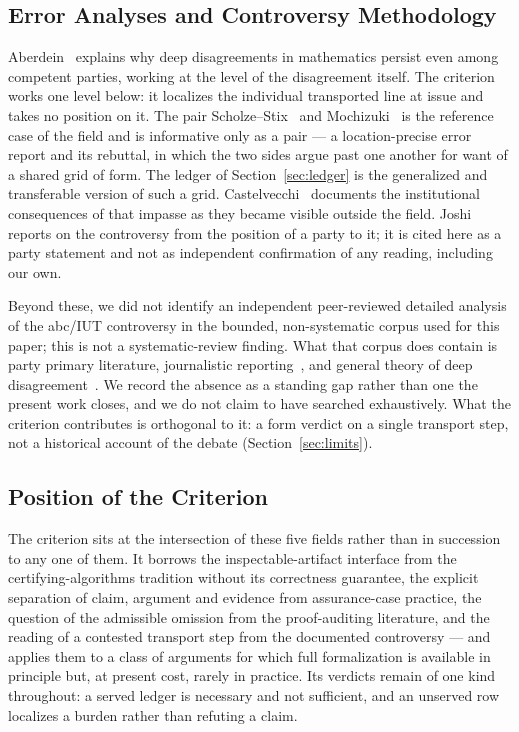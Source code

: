 \documentclass[11pt,a4paper]{article}
\begin{document}
\subsection{Error Analyses and Controversy Methodology}\label{sec:related-controversy}

Aberdein~\cite{Aberdein2023} explains why deep disagreements in mathematics
persist even among competent parties, working at the level of the disagreement
itself. The criterion works one level below: it localizes the individual
transported line at issue and takes no position on it. The pair
Scholze--Stix~\cite{ScholzeStix2018} and Mochizuki~\cite{Mochizuki2019} is the
reference case of the field and is informative only as a pair --- a
location-precise error report and its rebuttal, in which the two sides argue past
one another for want of a shared grid of form. The ledger of
Section~\ref{sec:ledger} is the generalized and transferable version of such a
grid. Castelvecchi~\cite{Castelvecchi2020} documents the institutional
consequences of that impasse as they became visible outside the field.
Joshi~\cite{Joshi2025Report} reports on the controversy from the position of a
party to it; it is cited here as a party statement and not as independent
confirmation of any reading, including our own.

Beyond these, we did not identify an independent peer-reviewed detailed analysis
of the abc/IUT controversy in the bounded, non-systematic corpus used for this
paper; this is not a systematic-review finding. What that corpus does contain is
party primary literature, journalistic reporting~\cite{Castelvecchi2020}, and
general theory of deep disagreement~\cite{Aberdein2023}. We record the absence
as a standing gap rather than one the present work closes, and we do not claim
to have searched exhaustively. What the criterion contributes is orthogonal to it:
a form verdict on a single transport step, not a historical account of the
debate (Section~\ref{sec:limits}).

\subsection{Position of the Criterion}\label{sec:related-position}

The criterion sits at the intersection of these five fields rather than in
succession to any one of them. It borrows the inspectable-artifact interface
from the certifying-algorithms tradition without its correctness guarantee, the
explicit separation of claim, argument and
evidence from assurance-case practice, the question of the admissible omission
from the proof-auditing literature, and the reading of a contested transport step
from the documented controversy --- and applies them to a class of arguments for
which full formalization is available in principle but, at present cost, rarely
in practice. Its verdicts remain of one kind throughout: a served ledger is
necessary and not sufficient, and an unserved row localizes a burden rather than
refuting a claim.
\end{document}
